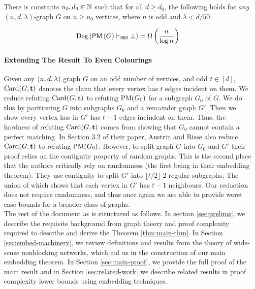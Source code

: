 \documentclass[11pt]{article}
\begin{document}
\begin{corollary}\label{thm:main-thm}

  There is constants $n_0, d_0 \in \mathbb{N}$ such that for all $d \geq d_0$, the following holds for \emph{any} $(n, d, \lambda)$-graph $G$ on $n \geq n_0$ vertices, where $n$ is odd and $\lambda < d/50$.

  \[ \text{Deg}\left(\mathsf{PM}\left(G\right) \vdash_{\texttt{SOS}} \bot\right) = \Omega\left(\frac{n}{\log n}\right)\]
\end{corollary}

\paragraph{Extending The Result To Even Colourings}
Given any $(n, d, \lambda)$ graph $G$ on an odd number of vertices, and odd $t\in [d]$, $\text{Card}(G, \mathbf{t})$ denotes the claim that every vertex has $t$ edges incident on them.
We reduce refuting $\text{Card}(G, \mathbf{t})$ to refuting $\text{PM}(G_0)$ for a subgraph $G_0$ of $G$.
We do this by paritioning $G$ into subgraphs $G_0$ and a remainder graph $G'$.
Then we show every vertex has in $G'$ has $t-1$ edges incindent on them.
Thus, the hardness of refuting $\text{Card}(G, \mathbf{t})$ comes from showing that $G_0$ cannot contain a perfect matching.
In Section 3.2 of their paper, Austrin and Risse also reduce $\text{Card}(G, \mathbf{t})$ to refuting $\text{PM}(G_0)$.
However, to split graph $G$ into $G_0$ and $G'$ their proof relies on the contiguity property \citep[See Chapter 23]{frieze2024introduction} of random graphs.
This is the second place that the authors critically rely on randomness (the first being in their embedding theorem).
They use contiguity to split $G'$ into $\lfloor t/2\rfloor$ 2-regular subgraphs.
The union of which shows that each vertex in $G'$ has $t-1$ neighbours.
Our reduction does not require randomness, and thus once again we are able to provide worst case bounds for a broader class of graphs.\\



The rest of the document as is structured as follows. In section \ref{sec:prelims}, we describe the requisite background from graph theory and proof complexity required to describe and derive the Theorem \ref{thm:main-thm}.
In Section \ref{sec:embed-machinery}, we review definitions and results from the theory of wide-sense nonblocking networks, which aid us in the construction of our main embedding theorem.
In Section \ref{sec:main-proof}, we provide the full proof of the main result and in Section \ref{sec:related-work} we describe related results in proof complexity lower bounds using embedding techniques.
\end{document}
